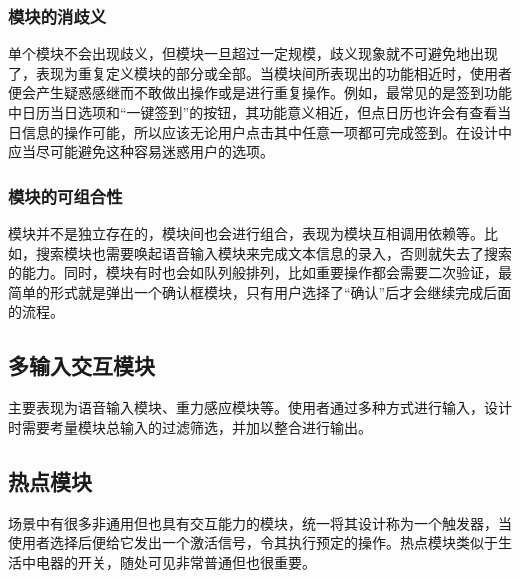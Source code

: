 \subsubsection{模块的消歧义}
单个模块不会出现歧义，但模块一旦超过一定规模，歧义现象就不可避免地出现了，表现为重复定义模块的部分或全部。当模块间所表现出的功能相近时，使用者便会产生疑惑感继而不敢做出操作或是进行重复操作。例如，最常见的是签到功能中日历当日选项和“一键签到”的按钮，其功能意义相近，但点日历也许会有查看当日信息的操作可能，所以应该无论用户点击其中任意一项都可完成签到。在设计中应当尽可能避免这种容易迷惑用户的选项。

\subsubsection{模块的可组合性}
模块并不是独立存在的，模块间也会进行组合，表现为模块互相调用依赖等。比如，搜索模块也需要唤起语音输入模块来完成文本信息的录入，否则就失去了搜索的能力。同时，模块有时也会如队列般排列，比如重要操作都会需要二次验证，最简单的形式就是弹出一个确认框模块，只有用户选择了“确认”后才会继续完成后面的流程。


\subsection{多输入交互模块}
主要表现为语音输入模块、重力感应模块等。使用者通过多种方式进行输入，设计时需要考量模块总输入的过滤筛选，并加以整合进行输出。

\subsection{热点模块}
场景中有很多非通用但也具有交互能力的模块，统一将其设计称为一个触发器，当使用者选择后便给它发出一个激活信号，令其执行预定的操作。热点模块类似于生活中电器的开关，随处可见非常普通但也很重要。